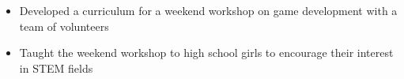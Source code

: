 \documentclass[letterpaper,10pt,titlepage]{article}
\begin{document}
\begin{itemize} \itemsep1pt \parskip0pt 
\item Developed a curriculum for a weekend workshop on game development with a team of volunteers
\item Taught the weekend workshop to high school girls to encourage their interest in STEM fields
\end{itemize}

\begin{comment} %
\begin{tabularx}{\linewidth}{Xr}
\textbf{\textit{OSU CARVE Lab}} & \textbf{Volunteer}\\
\textbf{Simulation Developer}   & March 2014 -- September 2014\\
Corvallis, Oregon & \\
\end{tabularx}
\begin{itemize} \itemsep1pt \parskip0pt \parsep0pt
\item Worked with a team of psychologists to create virtually simulated testing environments for experiments
\item Designed, programmed, and debugged a testing environment to the standards of the experiment design
\item Created virtual testing environments using Python and the Vizard Virtual Reality libraries for Spectroscopic Head-Mounted Displays Simulations
\end{itemize}
\end{comment}


\begin{comment} %
\begin{tabularx}{\linewidth}{Xr}
\textbf{\textit{Crossroads Carnegie Art Center}} & \textbf{Volunteer}\\
\textbf{Technical Support, Web Master}           & June 2013 -- August 2013\\
Baker City, Oregon & \\
\end{tabularx}

\begin{itemize} \itemsep1pt \parskip0pt \parsep0pt
\item Created digital backups of previous years tax information
\item Transferred customer data to a new cloud database for the Center
\item Maintained custom PHP/XHTML website to specifications
\item Provided consultation on creation of requirements for a new website
\end{itemize}
\end{comment}
\end{document}
